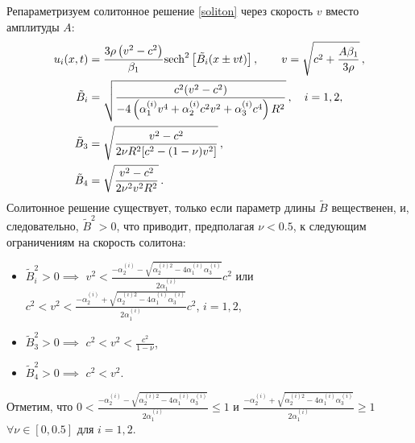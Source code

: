 \documentclass[12pt, a4paper]{report}
\begin{document}
Репараметризуем солитонное решение \eqref{soliton} через скорость $v$ вместо амплитуды $A$:
\begin{align}
\label{soliton_v}
u_i(x, t) &= \frac{3 \rho \left(v^2 - c^2\right)}{\beta_1} {\rm sech}^{2}\left[\tilde{B_i}(x\pm v t)\right], \qquad v = \sqrt{c^2+\frac{A\beta_1}{3 \rho}} \, ,\\
\label{Bimod}
\tilde{B}_i &= \sqrt{\frac{c^2(v^2- c^2)}{-4\left(\alpha_1^{(i)} v^4 + \alpha_2^{(i)} c^2 v^2 + \alpha_3^{(i)}c^4\right)R^2}} \, , \quad i =1,2,\\
\label{B3mod}
\tilde{B}_3 &= \sqrt{\frac{v^2- c^2}{2\nu R^2 [c^2 - (1 - \nu) v^2 ]}} \, ,\\
\label{B4mod}
\tilde{B}_4 &= \sqrt{\frac{v^2- c^2}{2\nu^2 v^2 R^2}} \, .
\end{align}
Солитонное решение существует, только если параметр длины $\tilde{B}$ вещественен, и, следовательно, $\tilde{B}^2 > 0$, что приводит, предполагая $\nu < 0.5$, к следующим ограничениям на скорость солитона:
\begin{itemize}
	\item $\tilde{B}_i^2 > 0 \implies$ $\displaystyle v^2 < \frac{-\alpha_2^{(i)} - \sqrt{\alpha_2^{(i)2} - 4\alpha_1^{(i)}\alpha_3^{(i)}}}{2\alpha_1^{(i)}} c^2$ или $\displaystyle c^2 < v^2 < \frac{-\alpha_2^{(i)} + \sqrt{\alpha_2^{(i)2} - 4\alpha_1^{(i)}\alpha_3^{(i)}}}{2\alpha_1^{(i)}} c^2$, $i=1,2$,
	\item $\tilde{B}_3^2 > 0 \implies$ $\displaystyle c^2 < v^2 < \frac{c^2}{1-\nu}$, 
	\item $\tilde{B}_4^2 > 0 \implies$ $c^2 < v^2$.
\end{itemize}
Отметим, что $\displaystyle 0 < \frac{-\alpha_2^{(i)} - \sqrt{\alpha_2^{(i)2} - 4\alpha_1^{(i)}\alpha_3^{(i)}}}{2\alpha_1^{(i)}} \leqslant 1$ и $\displaystyle \frac{-\alpha_2^{(i)} + \sqrt{\alpha_2^{(i)2} - 4\alpha_1^{(i)}\alpha_3^{(i)}}}{2\alpha_1^{(i)}} \geqslant 1$ $\forall \nu\in[0, 0.5]$ для $i=1,2$. 
\end{document}
